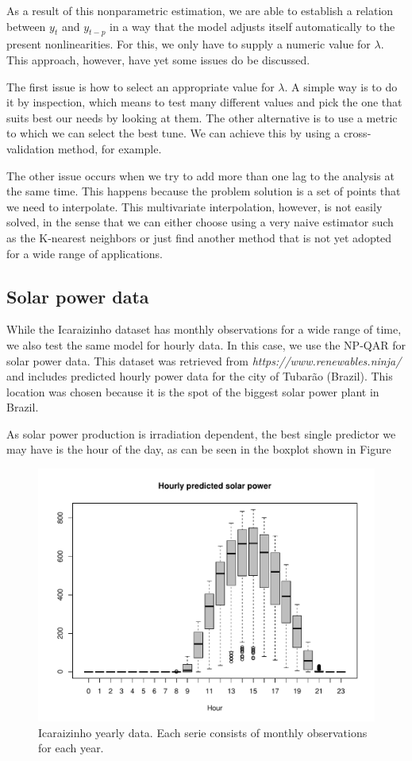 As a result of this nonparametric estimation, we are able to establish a relation between $y_t$ and $y_{t-p}$ in a way that the model adjusts itself automatically to the present nonlinearities. For this, we only have to supply a numeric value for $\lambda$. This approach, however, have yet some issues do be discussed. 

The first issue is how to select an appropriate value for $\lambda$. A simple way is to do it by inspection, which means to test many different values and pick the one that suits best our needs by looking at them. The other alternative is to use a metric to which we can select the best tune. We can achieve this by using a cross-validation method, for example.

The other issue occurs when we try to add more than one lag to the analysis at the same time. This happens because the problem solution is a set of points that we need to interpolate. This multivariate interpolation, however, is not easily solved, in the sense that we can either choose using a very naive estimator such as the K-nearest neighbors or just find another method that is not yet adopted for a wide range of applications.

\subsection{Solar power data}

While the Icaraizinho dataset has monthly observations for a wide range of time, we also test the same model for hourly data. In this case, we use the NP-QAR for solar power data. This dataset was retrieved from \textit{https://www.renewables.ninja/} and includes predicted hourly power data for the city of Tubarão (Brazil).
This location was chosen because it is the spot of the biggest solar power plant in Brazil. 

As solar power production is irradiation dependent, the best single predictor we may have is the hour of the day, as can be seen in the boxplot shown in Figure 

\begin{figure}[h]
	\centering
	\includegraphics[width=0.8\linewidth]{Figuras/npqar-solar/hourly-solar-power.pdf}
	\caption{Icaraizinho yearly data. Each serie consists of monthly observations for each year.}
	\label{fig:solar-tubarao}
\end{figure}





